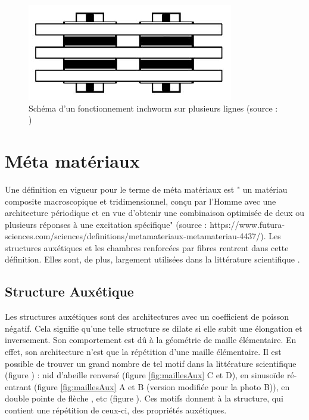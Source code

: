 \documentclass[10pt, a4paper]{article}
\begin{document}
\begin{figure}[ht!]
\centering
\includegraphics[scale=0.5]{ImageIntro/multipleInch.PNG}
\caption{ Schéma d'un fonctionnement inchworm sur plusieurs lignes (source : \cite{Landberg2017})}
\label{fig:multipleinchworm}
\end{figure}

\section{Méta matériaux} 

    Une définition en vigueur pour le terme de méta matériaux est " un matériau composite macroscopique et tridimensionnel, conçu par l'Homme avec une architecture périodique et en vue d'obtenir une combinaison optimisée de deux ou plusieurs réponses à une excitation spécifique" (source : https://www.futura-sciences.com/sciences/definitions/metamateriaux-metamateriau-4437/). Les structures auxétiques et les chambres renforcées par fibres rentrent dans cette définition. Elles sont, de plus, largement utilisées dans la littérature scientifique \cite{Doumit2009} \cite{Chou1996} \cite{Sedal2018} \cite{Sedal2018a} \cite{Lazarus2017} \cite{Takashima2010} \cite{Connolly2017} \cite{Polygerinos2015} \cite{Mark2016} \cite{Bruyas2016} \cite{Pfeil2018}. 
    
    
    \subsection{Structure Auxétique}
    
    Les structures auxétiques sont des architectures avec un coefficient de poisson négatif. Cela signifie qu'une telle structure se dilate si elle subit une élongation et inversement. Son comportement est dû à la géométrie de maille élémentaire. En effet, son architecture n'est que la répétition d'une maille élémentaire. Il est possible de trouver un grand nombre de tel motif dans la littérature scientifique (figure ) : nid d'abeille renversé \cite{Sedal2018} \cite{Alderson2007} \cite{Schumacher2018} \cite{Naboni2015} \cite{Lakes1991} \cite{Karnessis2013} \cite{Simons2019} \cite{AlvarezElipe2012} (figure \ref{fig:maillesAux} C et D), en sinusoïde ré-entrant \cite{Simons2019} \cite{Naboni2015} \cite{AlvarezElipe2012} (figure \ref{fig:maillesAux} A et B (version modifiée pour la photo B)), en double pointe de flèche \cite{Alderson2007} \cite{Karnessis2013} \cite{AlvarezElipe2012}, etc (figure ). Ces motifs donnent à la structure, qui contient une répétition de ceux-ci, des propriétés auxétiques. 
    
\end{document}
